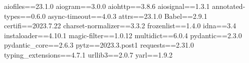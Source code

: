 aiofiles==23.1.0
aiogram==3.0.0
aiohttp==3.8.6
aiosignal==1.3.1
annotated-types==0.6.0
async-timeout==4.0.3
attrs==23.1.0
Babel==2.9.1
certifi==2023.7.22
charset-normalizer==3.3.2
frozenlist==1.4.0
idna==3.4
instaloader==4.10.1
magic-filter==1.0.12
multidict==6.0.4
pydantic==2.3.0
pydantic_core==2.6.3
pytz==2023.3.post1
requests==2.31.0
typing_extensions==4.7.1
urllib3==2.0.7
yarl==1.9.2
